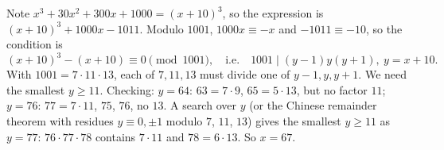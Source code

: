 Note $x^3+30x^2+300x+1000=(x+10)^3$, so the expression is $(x+10)^3+1000x-1011$. Modulo $1001$, $1000x\equiv-x$ and $-1011\equiv-10$, so the condition is
\[(x+10)^3-(x+10)\equiv0\pmod{1001},\quad\text{i.e.}\quad1001\mid(y-1)y(y+1),\ y=x+10.\]
With $1001=7\cdot11\cdot13$, each of $7,11,13$ must divide one of $y-1,y,y+1$. We need the smallest $y\ge11$. Checking: $y=64$: $63=7\cdot9$, $65=5\cdot13$, but no factor $11$; $y=76$: $77=7\cdot11$, $75$, $76$, no $13$. A search over $y$ (or the Chinese remainder theorem with residues $y\equiv0,\pm1$ modulo $7$, $11$, $13$) gives the smallest $y\ge11$ as $y=77$: $76\cdot77\cdot78$ contains $7\cdot11$ and $78=6\cdot13$. So $x=\boxed{67}$.
